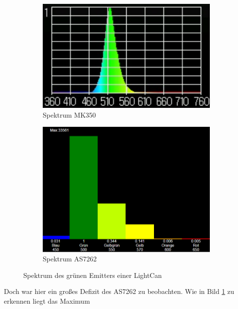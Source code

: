\documentclass[11pt]{scrartcl}
\begin{document}
\begin{figure}[H]
    \centering
    \begin{subfigure}[b]{0.49\textwidth}
        \includegraphics[width=\textwidth]{images/mk350_lightcan_green_spectrum.png}
        \caption{Spektrum MK350}\label{fig:green_spec_MK350}
    \end{subfigure}
    \hfill 
    \begin{subfigure}[b]{0.49\textwidth}
        \includegraphics[width=\textwidth]{images/app_lightcan_green_spectrum.png}
        \caption{Spektrum AS7262}\label{fig:green_spec_7262}
    \end{subfigure}
    \caption{Spektrum des grünen Emitters einer LightCan}
\end{figure}
\noindent
Doch war hier ein großes Defizit des AS7262 zu beobachten. Wie in Bild  \ref{fig:green_spec_MK350} zu erkennen liegt das Maximum
\end{document}
